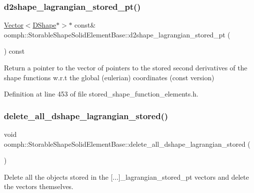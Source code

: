 \subsubsection{\texorpdfstring{d2shape\+\_\+lagrangian\+\_\+stored\+\_\+pt()}{d2shape\_lagrangian\_stored\_pt()}\hspace{0.1cm}{\footnotesize\ttfamily [2/2]}}
{\footnotesize\ttfamily \hyperlink{classoomph_1_1Vector}{Vector}$<$\hyperlink{classoomph_1_1DShape}{D\+Shape}$\ast$$>$$\ast$ const\& oomph\+::\+Storable\+Shape\+Solid\+Element\+Base\+::d2shape\+\_\+lagrangian\+\_\+stored\+\_\+pt (\begin{DoxyParamCaption}{ }\end{DoxyParamCaption}) const\hspace{0.3cm}{\ttfamily [inline]}}



Return a pointer to the vector of pointers to the stored second derivatives of the shape functions w.\+r.\+t the global (eulerian) coordinates (const version) 



Definition at line 453 of file stored\+\_\+shape\+\_\+function\+\_\+elements.\+h.

\mbox{\label{classoomph_1_1StorableShapeSolidElementBase_ad5854362861320a83be19c6a5eebe3a5}} 
\subsubsection{\texorpdfstring{delete\+\_\+all\+\_\+dshape\+\_\+lagrangian\+\_\+stored()}{delete\_all\_dshape\_lagrangian\_stored()}}
{\footnotesize\ttfamily void oomph\+::\+Storable\+Shape\+Solid\+Element\+Base\+::delete\+\_\+all\+\_\+dshape\+\_\+lagrangian\+\_\+stored (\begin{DoxyParamCaption}{ }\end{DoxyParamCaption})}



Delete all the objects stored in the \mbox{[}...\mbox{]}\+\_\+lagrangian\+\_\+stored\+\_\+pt vectors and delete the vectors themselves. 

